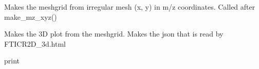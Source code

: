 \documentclass[letterpaper,10pt,openany,oneside]{sphinxmanual}
\begin{document}
\begin{fulllineitems}
\begin{fulllineitems}
\end{fulllineitems}


\begin{fulllineitems}
\label{rst/visu2d:Visu.zooming.ZOOM3D.makemeshfromirreg}
Makes the meshgrid from irregular mesh (x, y) in m/z coordinates.
Called after make\_mz\_xyz()

\end{fulllineitems}


\begin{fulllineitems}
\label{rst/visu2d:Visu.zooming.ZOOM3D.plotregion3d}
Makes the 3D plot from the meshgrid.
Makes the json that is read by FTICR2D\_3d.html

\end{fulllineitems}


\begin{fulllineitems}
\label{rst/visu2d:Visu.zooming.ZOOM3D.pr}
print

\end{fulllineitems}


\end{fulllineitems}

\end{document}
